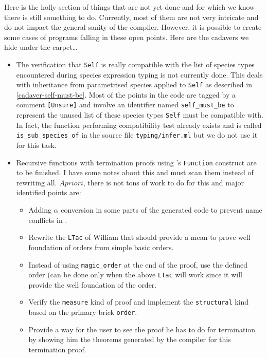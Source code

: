 \label{cadavers}
Here is the holly section of things that are not yet done and for
which we know there is still something to do. Currently, most of them
are not very intricate and do not impact the general sanity of the
compiler. However, it is possible to create some cases of programs
falling in these open points. Here are the cadavers we hide under the
carpet\ldots\smiley


\begin{itemize}
\item The verification that {\tt Self} is really compatible with the
  list of species types encountered during species expression typing
  is not currently done. This deals with inheritance from parametrised
  species applied to {\tt Self} as described in
  \ref{cadaver-self-must-be}. Most of the points in the code are
  tagged by a comment {\tt [Unsure]} and involve an identifier
  named {\tt self\_must\_be} to represent the unused list of these
  species types {\tt Self} must be compatible with. In fact, the
  function performing compatibility test already exists and is called
  {\tt is\_sub\_species\_of} in the source file {\tt typing/infer.ml}
  but we do not use it for this task.

\item Recursive functions with termination proofs using \coq's
  {\tt Function} construct are to be finished. I have some notes
  about this and must scan them instead of rewriting all. $A
  priori$, there is not tons of work to do for this and major
  identified points are:
  \begin{itemize}
  \item Adding $\alpha$ conversion in some parts of the generated
    code to prevent name conflicts in \coq.
  \item Rewrite the {\tt LTac} of William that should provide a mean
    to prove well foundation of orders from simple basic orders.
  \item Instead of using {\tt magic\_order} at the end of the proof,
    use the defined order (can be done only when the above {\tt LTac}
    will work since it will provide the well foundation of the
    order.
  \item Verify the {\tt measure} kind of proof and implement the
    {\tt structural} kind based on the primary brick {\tt order}.
  \item Provide a way for the user to see the proof he has to do for
    termination by showing him the theorems generated by the compiler
    for this termination proof.
  \end{itemize}


\end{itemize}
